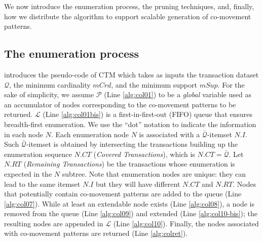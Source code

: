 \documentclass[
]{ceurart}
\begin{document}
We now introduce the enumeration process, the pruning techniques, and, finally, how we distribute the algorithm to support scalable generation of co-movement patterns.

\subsection{The enumeration process}
 introduces the pseudo-code of CTM which takes as inputs the transaction dataset $\mathcal{Q}$, the minimum cardinality $mCrd$, and the minimum support $mSup$.
For the sake of simplicity, we assume $\mathcal{P}$ (Line \ref{alg:col01}) to be a \textit{global} variable used as an accumulator of nodes corresponding to the co-movement patterns to be returned.
$\mathcal{L}$ (Line \ref{alg:col01bis}) is a first-in-first-out (FIFO) queue that ensures breadth-first enumeration.
We use the ``dot'' notation to indicate the information in each node $N$.
Each enumeration node $N$ is associated with a $\bar{\mathcal{Q}}$-itemset $N.I$.
Such $\bar{\mathcal{Q}}$-itemset is obtained by intersecting the transactions building up the enumeration sequence $N.CT$ (\textit{Covered Transactions}), which is $N.CT=\bar{\mathcal{Q}}$.
Let $ N.RT $ (\textit{Remaining Transactions}) be the transactions whose enumeration is expected in the $N$ subtree.
Note that enumeration nodes are unique: they can lead to the same itemset $N.I$ but they will have different $N.CT$ and $N.RT$.
Nodes that potentially contain co-movement patterns are added to the queue (Line \ref{alg:col07}).
While at least an extendable node exists (Line \ref{alg:col08}), a node is removed from the queue (Line \ref{alg:col09}) and extended (Line \ref{alg:col10-bis}); the resulting nodes are appended in $\mathcal{L}$ (Line \ref{alg:col10}).
Finally, the nodes associated with co-movement patterns are returned (Line \ref{alg:colret}).
\end{document}
